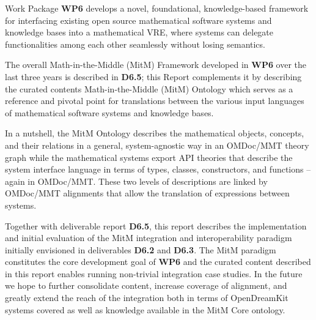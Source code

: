 Work Package \textbf{WP6} develops a novel, foundational, knowledge-based framework for interfacing existing open source mathematical software systems and knowledge bases into a mathematical VRE, where systems can delegate functionalities among each other seamlessly without losing semantics.

The overall Math-in-the-Middle (MitM) Framework developed in \textbf{WP6} over the last three years is described in \textbf{D6.5}; this Report complements it by describing the curated contents Math-in-the-Middle (MitM) Ontology which serves as a reference and pivotal point for translations between the various input languages of mathematical software systems and knowledge bases.

In a nutshell, the MitM Ontology describes the mathematical objects, concepts, and their relations in a general, system-agnostic way in an OMDoc/MMT theory graph while the mathematical systems export API theories that describe the system interface language in terms of types, classes, constructors, and functions -- again in OMDoc/MMT.
These two levels of descriptions are linked by OMDoc/MMT alignments that allow the translation of expressions between systems.

Together with deliverable report \textbf{D6.5}, this report describes the implementation and initial evaluation of the MitM integration and interoperability paradigm initially envisioned in deliverables \textbf{D6.2} and \textbf{D6.3}. The MitM paradigm constitutes the core development goal of \textbf{WP6} and the curated content described in this report enables running non-trivial integration case studies. In the future we hope to further consolidate content, increase coverage of alignment, and greatly extend the reach of the integration both in terms of OpenDreamKit systems covered as well as knowledge available in the MitM Core ontology. 



